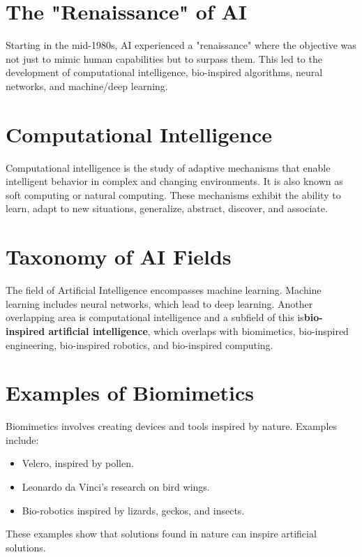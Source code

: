 \section{The "Renaissance" of AI}
Starting in the mid-1980s, AI experienced a "renaissance" where the objective was not just to mimic human capabilities but to surpass them. This led to the development of computational intelligence, bio-inspired algorithms, neural networks, and machine/deep learning.

\section{Computational Intelligence}
Computational intelligence is the study of adaptive mechanisms that enable intelligent behavior in complex and changing environments. It is also known as soft computing or natural computing. These mechanisms exhibit the ability to learn, adapt to new situations, generalize, abstract, discover, and associate.

\section{Taxonomy of AI Fields}
The field of Artificial Intelligence encompasses machine learning.  Machine learning includes neural networks, which lead to deep learning. Another overlapping area is computational intelligence and a subfield of this is\textbf{bio-inspired artificial intelligence}, which overlaps with biomimetics, bio-inspired engineering, bio-inspired robotics, and bio-inspired computing.

\section{Examples of Biomimetics}
Biomimetics involves creating devices and tools inspired by nature. Examples include:
\begin{itemize}
    \item Velcro, inspired by pollen.
    \item Leonardo da Vinci's research on bird wings.
    \item Bio-robotics inspired by lizards, geckos, and insects.
\end{itemize}
These examples show that solutions found in nature can inspire artificial solutions.

